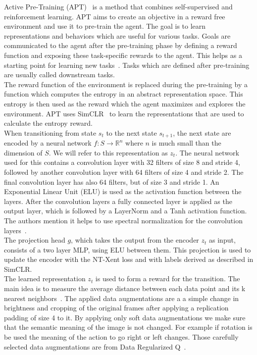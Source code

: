 \documentclass{article}
\begin{document}
Active Pre-Training (APT)~\cite{DBLP:journals/corr/abs-2103-04551} is a method that combines self-supervised
and reinforcement learning. APT aims to create an objective in a reward free environment and use it to pre-train
the agent. The goal is to learn representations and behaviors which are useful for various tasks.
Goals are communicated to the agent after the pre-training phase by defining a reward function and
exposing these task-specific rewards to the agent. This helps as a starting point for learning new
tasks~\cite{DBLP:journals/corr/abs-2106-09226}. Tasks which are defined after pre-training are usually
called downstream tasks.\\
The reward function of the environment is replaced during the pre-training by a function
which computes the entropy in an abstract representation space. This entropy is then used as the reward
which the agent maximizes and explores the environment. APT uses
SimCLR~\cite{DBLP:journals/corr/abs-2002-05709} to learn the representations that are used
to calculate the entropy reward.\\
When transitioning from state $s_t$ to the next state $s_{t+1}$,
the next state are encoded by a neural network $f : S \xrightarrow{} \mathbb{R}^n$ where $n$ is much small than 
the dimension of $S$. We will refer to this representation as $z_t$.
The neural network used for this contains a convolution layer with 32 filters of size 8 and stride 4, followed by
another convolution layer with 64 filters of size 4 and stride 2. The final convolution layer has also 64 filters, but of
size 3 and stride 1. An Exponential Linear Unit (ELU) is used as the activation function between the layers.
After the convolution layers a fully connected layer is applied as the output layer, which is followed by 
a LayerNorm and a Tanh activation function. The authors mention it helps to use spectral normalization for the 
convolution layers~\cite{DBLP:journals/corr/abs-2103-04551}.\\
The projection head $g$, which takes the output from the encoder $z_t$ as input, consists of a two layer MLP, using ELU between them.
This projection is used to update the encoder with the NT-Xent loss and with labels derived as described in SimCLR.\\
The learned representation $z_{t}$ is used to form a reward for the transition. The main idea
is to measure the average distance between each data point and its k nearest neighbors~\cite{doi:10.1080/01966324.2003.10737616}.
The applied data augmentations are a a simple change in brightness and cropping of the original frames
after applying a replication padding of size 4 to it. By applying only soft data augmentations
we make sure that the semantic meaning of the image is not changed. For example if rotation
is be used the meaning of the action to go right or left changes. Those carefully selected
data augmentations are from Data Regularized Q~\cite{DBLP:journals/corr/abs-2004-13649}.
\end{document}

